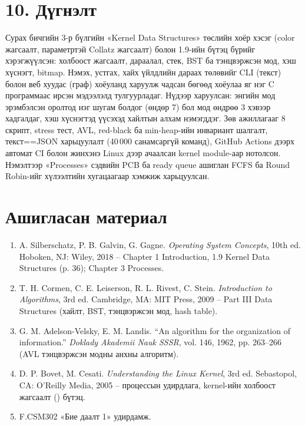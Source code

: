 \section*{10. Дүгнэлт}

Сурах бичгийн 3-р бүлгийн «Kernel Data Structures» төслийн хоёр хэсэг (color жагсаалт,  параметртэй Collatz жагсаалт) болон 1.9-ийн бүтэц бүрийг хэрэгжүүлсэн: холбоост жагсаалт, дараалал, стек, BST ба тэнцвэржсэн мод, хэш хүснэгт, bitmap. Нэмэх, устгах, хайх үйлдлийн дараах төлөвийг CLI (текст) болон веб хуудас (граф) хоёуланд харуулж чадсан бөгөөд хоёулаа яг нэг C программаас ирсэн мэдээлэлд тулгуурладаг. Нүдээр харуулсан: энгийн мод эрэмбэлсэн оролтод нэг шугам болдог (өндөр 7) бол  мод өндрөө 3 хэвээр хадгалдаг, хэш хүснэгтэд  үүсэхэд хайлтын алхам нэмэгддэг. Зөв ажиллагааг 8 скрипт, stress тест, AVL, red-black ба min-heap-ийн инвариант шалгалт, текст==JSON харьцуулалт (40\,000 санамсаргүй команд), GitHub Actions дээрх автомат CI болон жинхэнэ Linux дээр ачаалсан kernel module-аар нотолсон. Нэмэлтээр «Processes» сэдвийн PCB ба ready queue ашиглан FCFS ба Round Robin-ийг хүлээлтийн хугацаагаар хэмжиж харьцуулсан.

\section*{Ашигласан материал}

\begin{enumerate}[leftmargin=22pt,itemsep=2pt,topsep=2pt]
  \item \hypertarget{ref1}{} A. Silberschatz, P. B. Galvin, G. Gagne. \textit{Operating System Concepts}, 10th ed. Hoboken, NJ: Wiley, 2018 -- Chapter 1 Introduction, 1.9 Kernel Data Structures (p. 36); Chapter 3 Processes.
  \item \hypertarget{ref2}{} T. H. Cormen, C. E. Leiserson, R. L. Rivest, C. Stein. \textit{Introduction to Algorithms}, 3rd ed. Cambridge, MA: MIT Press, 2009 -- Part III Data Structures (хайлт, BST, тэнцвэржсэн мод, hash table).
  \item \hypertarget{ref3}{} G. M. Adelson-Velsky, E. M. Landis. ``An algorithm for the organization of information.'' \textit{Doklady Akademii Nauk SSSR}, vol. 146, 1962, pp. 263--266 (AVL тэнцвэржсэн модны анхны алгоритм).
  \item \hypertarget{ref4}{} D. P. Bovet, M. Cesati. \textit{Understanding the Linux Kernel}, 3rd ed. Sebastopol, CA: O'Reilly Media, 2005 -- процессын удирдлага, kernel-ийн холбоост жагсаалт () бүтэц.
  \item \hypertarget{ref5}{} F.CSM302 «Бие даалт 1» удирдамж.
\end{enumerate}

